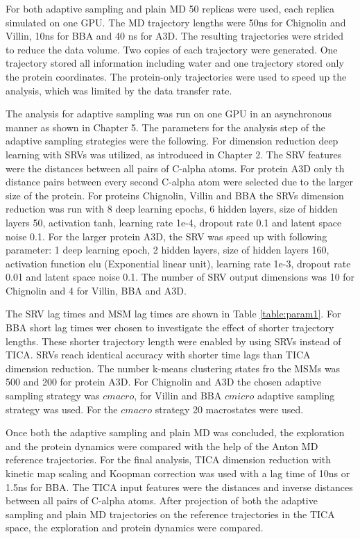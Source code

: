 For both adaptive sampling and plain MD 50 replicas were used, each replica simulated on one GPU. The MD trajectory lengths were 50ns for Chignolin and Villin, 10ns for BBA and 40 ns for A3D.  The resulting trajectories were strided to reduce the data volume. Two copies of each trajectory were generated. One trajectory stored all information including water and one trajectory stored only the protein coordinates. The protein-only trajectories were used to speed up the analysis, which was limited by the data transfer rate.


The analysis for adaptive sampling was run on one GPU in an asynchronous manner as shown in Chapter 5. The parameters for the analysis step of the adaptive sampling strategies were the following.  For dimension reduction deep learning with SRVs was utilized, as introduced in Chapter 2.
The SRV features were the distances between all pairs of C-alpha atoms. For protein A3D only th distance pairs between every second C-alpha atom were selected due to the larger size of the protein.  For proteins Chignolin, Villin and BBA the SRVs dimension reduction was run with 8 deep learning epochs, 6 hidden layers, size of hidden layers 50, activation tanh, learning rate 1e-4, dropout rate 0.1 and latent space noise 0.1. For the larger protein A3D, the SRV was speed up with following parameter: 1 deep learning epoch, 2 hidden layers, size of hidden layers 160, activation function elu (Exponential linear unit), learning rate 1e-3, dropout rate 0.01 and latent space noise 0.1. The number of SRV output dimensions was 10 for Chignolin and 4 for Villin, BBA and A3D. 

The SRV lag times and MSM lag times are shown in Table \ref{table:param1}. For BBA short lag times wer chosen to investigate the effect of shorter trajectory lengths. These shorter trajectory length were enabled by using SRVs instead of TICA. SRVs reach identical accuracy with shorter time lags than TICA dimension reduction\cite{chen2019jcp}. The number k-means clustering states fro the MSMs was 500 and 200 for protein A3D. For Chignolin and A3D the chosen adaptive sampling strategy was $cmacro$, for Villin and BBA $cmicro$ adaptive sampling strategy was used. For the $cmacro$ strategy 20 macrostates were used.

Once both the adaptive sampling and plain MD was concluded, the exploration and the protein dynamics were compared with the help of the Anton MD reference trajectories. For the final analysis, TICA dimension reduction with kinetic map scaling and Koopman correction was used with a lag time of 10ns or 1.5ns for BBA. The TICA input features were the distances and inverse distances between all pairs of C-alpha atoms. After projection of both the adaptive sampling and plain MD trajectories on the reference trajectories in the TICA space, the exploration and protein dynamics were compared.

